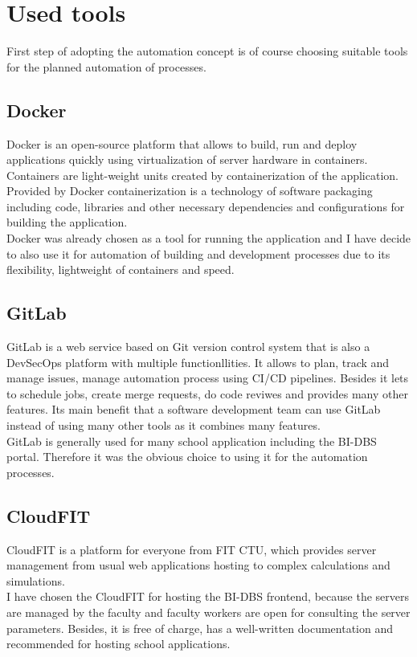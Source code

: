 \section{Used tools} First step of adopting the automation concept is of course choosing suitable tools for the planned automation of processes.

\subsection{Docker} Docker is an open-source platform that allows to build, run and deploy applications quickly using virtualization of server hardware in containers. Containers are light-weight units created by containerization of the application. Provided by Docker containerization is a technology of software packaging including code, libraries and other necessary dependencies and configurations for building the application.\\
Docker was already chosen as a tool for running the application and I have decide to also use it for automation of building and development processes due to its flexibility, lightweight of containers and speed.

\subsection{GitLab} GitLab is a web service based on Git version control system that is also a DevSecOps platform with multiple functionllities. It allows to plan, track and manage issues, manage automation process using CI/CD pipelines. Besides it lets to schedule jobs, create merge requests, do code reviwes and provides many other features. Its main benefit that a software development team can use GitLab instead of using many other tools as it combines many features.\\
GitLab is generally used for many school application including the BI-DBS portal. Therefore it was the obvious choice to using it for the automation processes.

\subsection{CloudFIT} CloudFIT is a platform for everyone from FIT CTU, which provides server management from usual web applications hosting to complex calculations and simulations.\\
I have chosen the CloudFIT for hosting the BI-DBS frontend, because the servers are managed by the faculty and faculty workers are open for consulting the server parameters. Besides, it is free of charge, has a well-written documentation and recommended for hosting school applications. 

